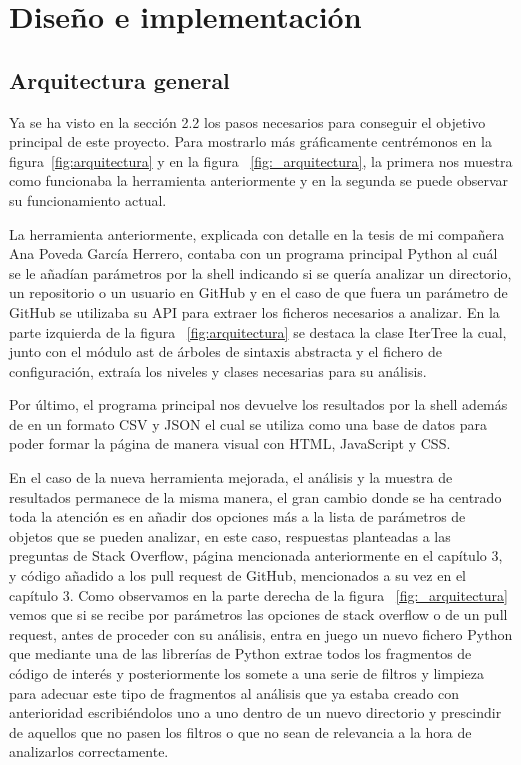 \documentclass[a4paper, 12pt]{book}
\begin{document}

\cleardoublepage
\chapter{Diseño e implementación}

\section{Arquitectura general} 
\label{sec:arquitectura}

Ya se ha visto en la sección 2.2 los pasos necesarios para conseguir el objetivo principal de este proyecto. Para mostrarlo más gráficamente centrémonos en la figura~\ref{fig:arquitectura} y en la figura ~\ref{fig:_arquitectura}, la primera nos muestra como funcionaba la herramienta anteriormente y en la segunda se puede observar su funcionamiento actual.

La herramienta anteriormente, explicada con detalle en la tesis de mi compañera Ana Poveda García Herrero, contaba con un programa principal Python al cuál se le añadían parámetros por la shell indicando si se quería analizar un directorio, un repositorio o un usuario en GitHub y en el caso de que fuera un parámetro de GitHub se utilizaba su API para extraer los ficheros necesarios a analizar. En la parte izquierda de la figura ~\ref{fig:arquitectura} se destaca la clase IterTree la cual, junto con el módulo ast de árboles de sintaxis abstracta y el fichero de configuración, extraía los niveles y clases necesarias para su análisis. 

Por último, el programa principal nos devuelve los resultados por la shell además de en un formato CSV y JSON el cual se utiliza como una base de datos para poder formar la página de manera visual con HTML, JavaScript y CSS.

En el caso de la nueva herramienta mejorada, el análisis y la muestra de resultados permanece de la misma manera, el gran cambio donde se ha centrado toda la atención es en añadir dos opciones más a la lista de parámetros de objetos que se pueden analizar, en este caso, respuestas planteadas a las preguntas de Stack Overflow, página mencionada anteriormente en el capítulo 3, y código añadido a los pull request de GitHub, mencionados a su vez en el capítulo 3. Como observamos en la parte derecha de la figura ~\ref{fig:_arquitectura} vemos que si se recibe por parámetros las opciones de stack overflow o de un pull request, antes de proceder con su análisis, entra en juego un nuevo fichero Python que mediante una de las librerías de Python extrae todos los fragmentos de código de interés y posteriormente los somete a una serie de filtros y limpieza para adecuar este tipo de fragmentos al análisis que ya estaba creado con anterioridad escribiéndolos uno a uno dentro de un nuevo directorio y prescindir de aquellos que no pasen los filtros o que no sean de relevancia a la hora de analizarlos correctamente.
\end{document}
